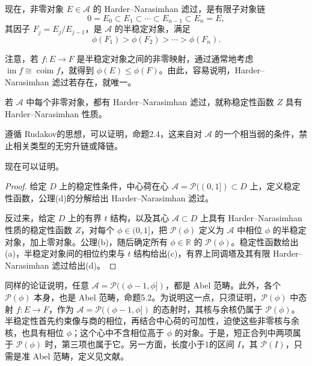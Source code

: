 现在，非零对象 $E\in\mathcal{A}$ 的 Harder--Narasimhan 滤过，是有限子对象链
\[
0=E_0\subset E_1\subset\cdots\subset E_{n-1}\subset E_n=E,
\]
其因子 $F_j=E_j/E_{j-1}$，是 $\mathcal{A}$ 的半稳定对象，满足
\[
\phi(F_1)>\phi(F_2)>\cdots>\phi(F_n).
\]

注意，若 $f\colon E\to F$ 是半稳定对象之间的非零映射，通过通常地考虑 $\operatorname{im}f\cong\operatorname{coim}f$，就得到 $\phi(E)\le\phi(F)$。由此，容易说明，Harder--Narasimhan 滤过若存在，就唯一。
\begin{definition}\label{def:5.36}
若 $\mathcal{A}$ 中每个非零对象，都有 Harder--Narasimhan 滤过，就称稳定性函数 $Z$ 具有 Harder--Narasimhan 性质。
\end{definition}

遵循 Rudakov的思想，可以证明，命题2.4，这来自对 $\mathcal{A}$ 的一个相当弱的条件，禁止相关类型的无穷升链或降链。

现在可以证明。
\begin{proof}
给定 $D$ 上的稳定性条件，中心荷在心 $\mathcal{A}=\mathcal{P}((0,1])\subset D$ 上，定义稳定性函数，公理(d)的分解给出 Harder--Narasimhan 滤过。

反过来，给定 $D$ 上的有界 $t$ 结构，以及其心 $\mathcal{A}\subset D$ 上具有 Harder--Narasimhan 性质的稳定性函数 $Z$，对每个 $\phi\in(0,1]$，把 $\mathcal{P}(\phi)$ 定义为 $\mathcal{A}$ 中相位 $\phi$ 的半稳定对象，加上零对象。公理(b)，随后确定所有 $\phi\in\mathbb{R}$ 的 $\mathcal{P}(\phi)$。稳定性函数给出(a)，半稳定对象间的相位约束与 $t$ 结构给出(c)，有界上同调塔及其有限 Harder--Narasimhan 滤过给出(d)。
\end{proof}

同样的论证说明，任意 $\mathcal{A}=\mathcal{P}((\phi-1,\phi])$，都是 Abel 范畴。此外，各个 $\mathcal{P}(\phi)$ 本身，也是 Abel 范畴，命题5.2。为说明这一点，只须证明，$\mathcal{P}(\phi)$ 中态射 $f\colon E\to F$，作为 $\mathcal{A}=\mathcal{P}((\phi-1,\phi])$ 的态射时，其核与余核仍属于 $\mathcal{P}(\phi)$。半稳定性首先约束像与商的相位，再结合中心荷的可加性，迫使这些非零核与余核，也具有相位 $\phi$；这个心中不含相位高于 $\phi$ 的对象。于是，短正合列中两项属于 $\mathcal{P}(\phi)$ 时，第三项也属于它。另一方面，长度小于1的区间 $I$，其 $\mathcal{P}(I)$，只需是准 Abel 范畴，定义见文献。

